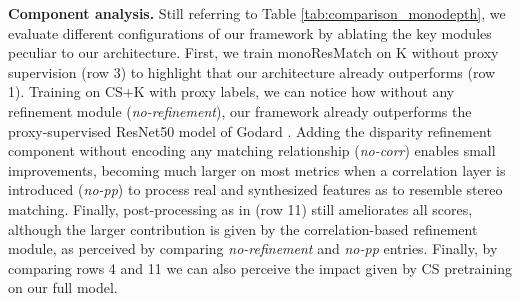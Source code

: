 \documentclass[10pt,twocolumn,letterpaper]{article}
\begin{document}
\textbf{Component analysis.} Still referring to Table \ref{tab:comparison_monodepth}, we evaluate different configurations of our framework by ablating the key modules peculiar to our architecture. 
First, we train monoResMatch on K without proxy supervision (row 3) to highlight that our architecture already outperforms \cite{monodepth17} (row 1). 
Training on CS+K with proxy labels, we can notice how without any refinement module (\textit{no-refinement}), our framework already outperforms the proxy-supervised ResNet50 model of Godard \etal \cite{monodepth17}. Adding the disparity refinement component without encoding any matching relationship (\textit{no-corr}) enables small improvements, becoming much larger on most metrics when a correlation layer is introduced (\textit{no-pp}) to process real and synthesized features as to resemble stereo matching. Finally, post-processing as in \cite{monodepth17} (row 11) still ameliorates all scores, although the larger contribution is given by the correlation-based refinement module, as perceived by comparing \textit{no-refinement} and \textit{no-pp} entries. Finally, by comparing rows 4 and 11 we can also perceive the impact given by CS pretraining on our full model.
\end{document}

